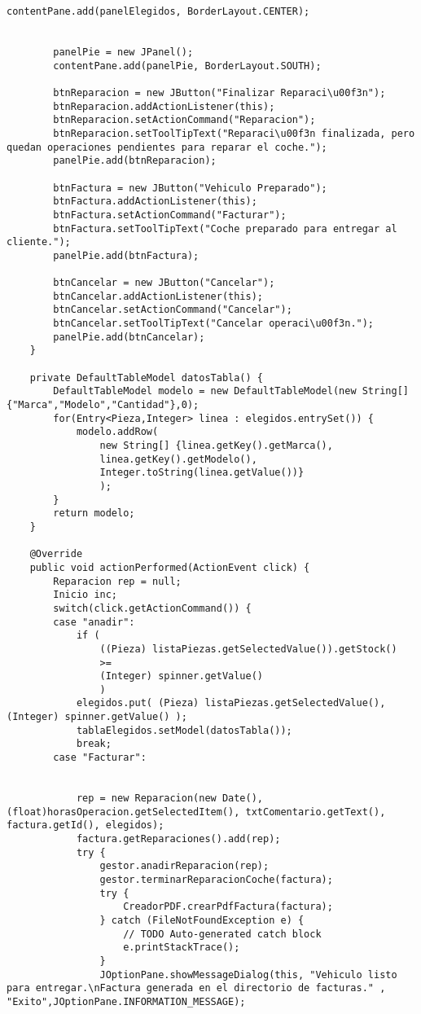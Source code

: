 \begin{lstlisting}[caption=VentanaReparacion.java (App Escritorio)]
		contentPane.add(panelElegidos, BorderLayout.CENTER);
		
		
		panelPie = new JPanel();
		contentPane.add(panelPie, BorderLayout.SOUTH);
		
		btnReparacion = new JButton("Finalizar Reparaci\u00f3n");
		btnReparacion.addActionListener(this);
		btnReparacion.setActionCommand("Reparacion");
		btnReparacion.setToolTipText("Reparaci\u00f3n finalizada, pero quedan operaciones pendientes para reparar el coche.");
		panelPie.add(btnReparacion);
		
		btnFactura = new JButton("Vehiculo Preparado");
		btnFactura.addActionListener(this);
		btnFactura.setActionCommand("Facturar");
		btnFactura.setToolTipText("Coche preparado para entregar al cliente.");
		panelPie.add(btnFactura);
		
		btnCancelar = new JButton("Cancelar");
		btnCancelar.addActionListener(this);
		btnCancelar.setActionCommand("Cancelar");
		btnCancelar.setToolTipText("Cancelar operaci\u00f3n.");
		panelPie.add(btnCancelar);
	}
	
	private DefaultTableModel datosTabla() {
		DefaultTableModel modelo = new DefaultTableModel(new String[]{"Marca","Modelo","Cantidad"},0);
		for(Entry<Pieza,Integer> linea : elegidos.entrySet()) {
			modelo.addRow(
                new String[] {linea.getKey().getMarca(), 
                linea.getKey().getModelo(),
                Integer.toString(linea.getValue())}
                );
		}
		return modelo;
	}
	
	@Override
	public void actionPerformed(ActionEvent click) {
		Reparacion rep = null;
		Inicio inc;
		switch(click.getActionCommand()) {
		case "anadir":
			if (
                ((Pieza) listaPiezas.getSelectedValue()).getStock() 
                >= 
                (Integer) spinner.getValue()
                )
			elegidos.put( (Pieza) listaPiezas.getSelectedValue(), (Integer) spinner.getValue() );
			tablaElegidos.setModel(datosTabla());
			break;
		case "Facturar":
			
			
			rep = new Reparacion(new Date(),(float)horasOperacion.getSelectedItem(), txtComentario.getText(), factura.getId(), elegidos);
			factura.getReparaciones().add(rep);
			try {
				gestor.anadirReparacion(rep);
				gestor.terminarReparacionCoche(factura);
				try {
					CreadorPDF.crearPdfFactura(factura);
				} catch (FileNotFoundException e) {
					// TODO Auto-generated catch block
					e.printStackTrace();
				}
				JOptionPane.showMessageDialog(this, "Vehiculo listo para entregar.\nFactura generada en el directorio de facturas." , "Exito",JOptionPane.INFORMATION_MESSAGE);
				

\end{lstlisting}
